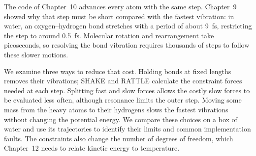 The code of Chapter~10 advances every atom with the same step. Chapter~9
showed why that step must be short compared with the fastest vibration:
in water, an oxygen--hydrogen bond stretches with a period of about
\SI{9}{\femto\second}, restricting the step to around
\SI{0.5}{\femto\second}. Molecular rotation and rearrangement take
picoseconds, so resolving the bond vibration requires thousands of steps
to follow these slower motions.

We examine three ways to reduce that cost. Holding bonds at fixed lengths
removes their vibrations; SHAKE and RATTLE calculate the constraint forces
needed at each step. Splitting fast and slow forces allows the costly
slow forces to be evaluated less often, although resonance limits the
outer step. Moving some mass from the heavy atoms to their hydrogens
slows the fastest vibrations without changing the potential energy. We
compare these choices on a box of water and use its trajectories to
identify their limits and common implementation faults. The constraints
also change the number of degrees of freedom, which Chapter~12 needs to
relate kinetic energy to temperature.
